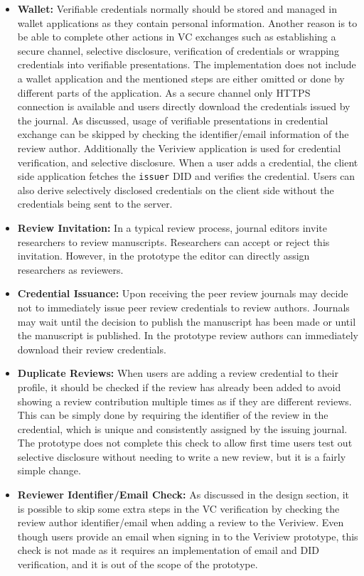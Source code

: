 \begin{itemize}
    \item \textbf{Wallet:} Verifiable credentials normally should be stored and managed in wallet applications as they contain personal information. Another reason is to be able to complete other actions in \acrshort{VC} exchanges such as establishing a secure channel, selective disclosure, verification of credentials or wrapping credentials into verifiable presentations. The implementation does not include a wallet application and the mentioned steps are either omitted or done by different parts of the application. As a secure channel only \acrshort{HTTP}S connection is available and users directly download the credentials issued by the journal. As discussed, usage of verifiable presentations in credential exchange can be skipped by checking the identifier/email information of the review author. Additionally the Veriview application is used for credential verification, and selective disclosure. When a user adds a credential, the client side application fetches the \lstinline{issuer} \acrshort{DID} and verifies the credential. Users can also derive selectively disclosed credentials on the client side without the credentials being sent to the server. 
    
    \item \textbf{Review Invitation:} In a typical review process, journal editors invite researchers to review manuscripts. Researchers can accept or reject this invitation. However, in the prototype the editor can directly assign researchers as reviewers.
    
    \item \textbf{Credential Issuance:} Upon receiving the peer review journals may decide not to immediately issue peer review credentials to review authors. Journals may wait until the decision to publish the manuscript has been made or until the manuscript is published. In the prototype review authors can immediately download their review credentials.
    
    \item \textbf{Duplicate Reviews:} When users are adding a review credential to their profile, it should be checked if the review has already been added to avoid showing a review contribution multiple times as if they are different reviews. This can be simply done by requiring the identifier of the review in the credential, which is unique and consistently assigned by the issuing journal. The prototype does not complete this check to allow first time users test out selective disclosure without needing to write a new review, but it is a fairly simple change.
    
    \item \textbf{Reviewer Identifier/Email Check:} As discussed in the design section, it is possible to skip some extra steps in the \acrshort{VC} verification by checking the review author identifier/email when adding a review to the Veriview. Even though users provide an email when signing in to the Veriview prototype, this check is not made as it requires an implementation of email and \acrshort{DID} verification, and it is out of the scope of the prototype.
    
\end{itemize}
